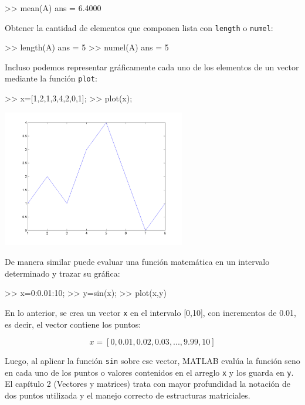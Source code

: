\begin{matlab}
>> mean(A)
ans =
    6.4000
\end{matlab}

Obtener la cantidad de elementos que componen lista con \texttt{length}
o \texttt{numel}:

\begin{matlab}
>> length(A)
ans =
     5
>> numel(A)
ans =
     5
\end{matlab}

Incluso podemos representar gráficamente cada uno de los elementos de un
vector mediante la función \texttt{plot}:

\begin{matlab}
>> x=[1,2,1,3,4,2,0,1];
>> plot(x);
\end{matlab}

\begin{center}
\includegraphics[width=0.6\textwidth]{images/ch1/img_1_2.png}
\label{fig:graph_fun}
\end{center}

De manera similar puede evaluar una función matemática en un intervalo
determinado y trazar su gráfica:

\begin{matlab}
>> x=0:0.01:10;
>> y=sin(x);
>> plot(x,y)
\end{matlab}

En lo anterior, se crea un vector \texttt{x} en el intervalo {[}0,10{]},
con incrementos de 0.01, es decir, el vector contiene los puntos:

$$ x = [0, 0.01, 0.02, 0.03,..., 9.99, 10] $$

Luego, al aplicar la función \texttt{sin} sobre ese vector, MATLAB
evalúa la función seno en cada uno de los puntos o valores contenidos en
el arreglo \texttt{x} y los guarda en \texttt{y}. El capítulo 2
(Vectores y matrices) trata con mayor profundidad la notación de dos
puntos utilizada y el manejo correcto de estructuras matriciales.

